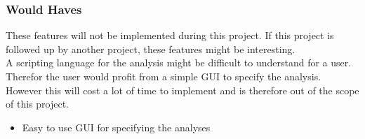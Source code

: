 \subsubsection{Would Haves}
These features will not be implemented during this project. If this project is followed up by another project, these features might be interesting.\\
A scripting language for the analysis might be difficult to understand for a user. Therefor the user would profit from a simple GUI to specify the analysis. However this will cost a lot of time to implement and is therefore out of the scope of this project. 
\begin{itemize}
	\item Easy to use GUI for specifying the analyses 
\end{itemize}
